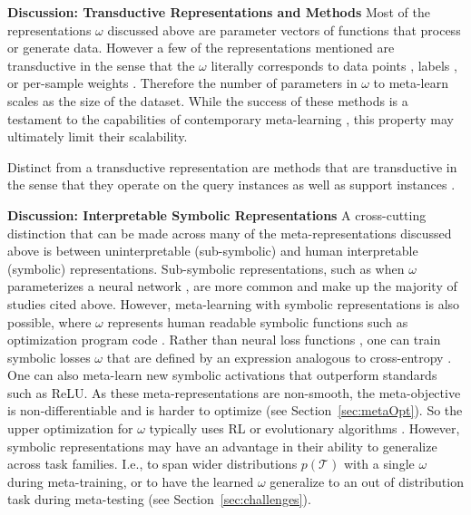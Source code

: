 \documentclass[10pt,journal,compsoc]{IEEEtran}
\newcommand{\keypoint}[1]{\vspace{0.1cm}\noindent\textbf{#1}\quad}
\begin{document}
\keypoint{Discussion: Transductive Representations and Methods} Most of the representations $\omega$ discussed above are parameter vectors of functions that process or generate data. However a few of the representations mentioned are transductive in the sense that the $\omega$ literally corresponds to data points \cite{wang2018datasetdistill}, labels \cite{weihong2019learn2impute}, or per-sample weights \cite{ren2018l2rw}. Therefore the number of parameters in $\omega$ to meta-learn scales as the size of the dataset. While the success of these methods is a testament to the capabilities of contemporary meta-learning \cite{lorraine2019optmillionsofhyperparams}, this property may ultimately limit their scalability.

Distinct from a transductive representation are methods that are transductive in the sense that they operate on the query instances as well as support instances \cite{antoniou2019learning,liu2019self}.

\keypoint{Discussion: Interpretable Symbolic Representations} A cross-cutting distinction that can be made across many of the meta-representations discussed above is between uninterpretable (sub-symbolic) and human interpretable (symbolic) representations. Sub-symbolic representations, such as when $\omega$ parameterizes a neural network \cite{andrychowicz2016graddescgraddesc}, are more common and make up the majority of studies cited above. However, meta-learning with symbolic representations is also possible, where $\omega$ represents human readable symbolic functions such as optimization program code \cite{bello2017neuraloptimizerrl}. 
Rather than neural loss functions \cite{li2019featurecritic}, one can train symbolic losses $\omega$ that are defined by an expression analogous to cross-entropy \cite{gonzalez2019baikalloss}. One can also meta-learn new symbolic activations \cite{ramachandran2017swish} that outperform standards such as ReLU. As these meta-representations are non-smooth, the meta-objective is non-differentiable and is harder to optimize (see Section~\ref{sec:metaOpt}). So the upper optimization for $\omega$ typically uses RL \cite{bello2017neuraloptimizerrl} or evolutionary algorithms \cite{gonzalez2019baikalloss}. However, symbolic representations may have an advantage \cite{bello2017neuraloptimizerrl,gonzalez2019baikalloss,ramachandran2017swish} in their ability to generalize across task families. I.e., to span wider distributions $p(\mathcal{T})$ with a single $\omega$ during meta-training, or to have the learned $\omega$ generalize to an out of distribution task during meta-testing (see Section~\ref{sec:challenges}). 
\end{document}
